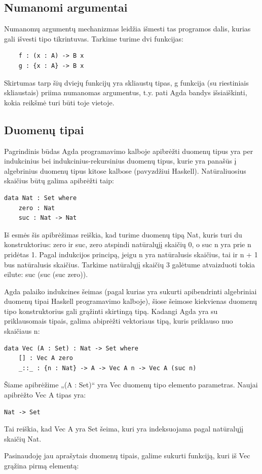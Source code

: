 \documentclass{VUMIFPSbakalaurinis}
\begin{document}
\subsection{Numanomi argumentai}
Numanomų argumentų mechanizmas leidžia išmesti tas programos dalis, kurias gali išvesti tipo tikrintuvas. Tarkime turime dvi funkcijas:
\begin{lstlisting}
	f : (x : A) -> B x
	g : {x : A} -> B x
\end{lstlisting}
Skirtumas tarp šių dviejų funkcijų yra skliaustų tipas, g funkcija (su riestiniais skliaustais) priima numanomas argumentus, t.y. pati Agda bandys išsiaiškinti, kokia reikšmė turi būti toje vietoje.
\subsection{Duomenų tipai}
Pagrindinis būdas Agda programavimo kalboje apibrėžti duomenų tipus yra per indukcinius bei indukcinius-rekursinius duomenų tipus, kurie yra panašūs į algebrinius duomenų tipus kitose kalbose (pavyzdžiui Haskell). Natūraliuosius  skaičius būtų galima apibrėžti taip:
\begin{lstlisting}
data Nat : Set where
	zero : Nat
	suc : Nat -> Nat
\end{lstlisting}
Iš esmės šis apibrėžimas reiškia, kad turime duomenų tipą Nat, kuris turi du konstruktorius: zero ir suc, zero atspindi natūralųjį skaičių 0, o suc n yra prie n pridėtas 1. Pagal indukcijos principą, jeigu n yra natūralusis skaičius, tai ir n + 1 bus natūralusis skaičius. Tarkime natūralųjį skaičių 3 galėtume atvaizduoti tokia eilute: suc (suc (suc zero)).\par Agda palaiko indukcines šeimas (pagal kurias yra sukurti apibendrinti algebriniai duomenų tipai Haskell programavimo kalboje), šiose šeimose kiekvienas duomenų tipo konstruktorius gali grąžinti skirtingą tipą. Kadangi Agda yra su priklausomais tipais, galima abiprėžti vektoriaus tipą, kuris priklauso nuo skaičiaus n:
\begin{lstlisting}
data Vec (A : Set) : Nat -> Set where
	[] : Vec A zero
	_::_ : {n : Nat} -> A -> Vec A n -> Vec A (suc n)
\end{lstlisting}
Šiame apibrėžime „(A : Set)“ yra Vec duomenų tipo elemento parametras. Naujai apibrėžto Vec A tipas yra:
\begin{lstlisting}
Nat -> Set
\end{lstlisting}
Tai reiškia, kad Vec A yra Set šeima, kuri yra indeksuojama pagal natūralųjį skaičių Nat.
\par Pasinaudoję jau aprašytais duomenų tipais, galime sukurti funkciją, kuri iš Vec grąžina pirmą elementą:
\end{document}

